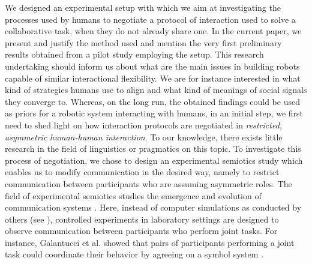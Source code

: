 We designed an experimental setup with which we aim at investigating the processes used by humans to negotiate a protocol of interaction used to solve a collaborative task, when they do not already share one. In the current paper, we present and justify the method used and mention the very first preliminary results obtained from a pilot study employing the setup. This research undertaking should inform us about what are the main issues in building robots capable of similar interactional flexibility. We are for instance interested in what kind of strategies humans use to align and what kind of meanings of social signals they converge to. Whereas, on the long run, the obtained findings could be used as priors for a robotic system interacting with humans, in an initial step, we first need to shed light on how interaction protocols are negotiated in \emph{restricted, asymmetric human-human interaction}. To our knowledge, there exists little research in the field of linguistics or pragmatics on this topic. To investigate this process of negotiation, we chose to design an experimental semiotics study which enables us to modify communication in the desired way, namely to restrict communication between participants who are assuming asymmetric roles. The field of experimental semiotics studies the emergence and evolution of communication systems \cite{galantucci2009experimental}. Here, instead of computer simulations as conducted by others (see \cite{cangelosi2002simulating,steels2012experiments}), controlled experiments in laboratory settings are designed to observe communication between participants who perform joint tasks. For instance, Galantucci et al. showed that pairs of participants performing a joint task could coordinate their behavior by agreeing on a symbol system \cite{galantucci2005experimental}.


